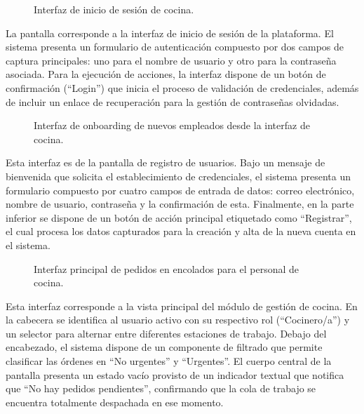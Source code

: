 \begin{figure}[H]
    \centering
    
    \caption{Interfaz de inicio de sesión de cocina.}
    \label{fig:ui-coc-01}
\end{figure}

La pantalla corresponde a la interfaz de inicio de sesión de la plataforma. El sistema presenta un formulario de autenticación compuesto por dos campos de captura principales: uno para el nombre de usuario y otro para la contraseña asociada. Para la ejecución de acciones, la interfaz dispone de un botón de confirmación (``Login'') que inicia el proceso de validación de credenciales, además de incluir un enlace de recuperación para la gestión de contraseñas olvidadas.

\begin{figure}[H]
    \centering
    
    \caption{Interfaz de onboarding de nuevos empleados desde la interfaz de cocina.}
    \label{fig:ui-coc-01-a}
\end{figure}

Esta interfaz es de la pantalla de registro de usuarios. Bajo un mensaje de bienvenida que solicita el establecimiento de credenciales, el sistema presenta un formulario compuesto por cuatro campos de entrada de datos: correo electrónico, nombre de usuario, contraseña y la confirmación de esta. Finalmente, en la parte inferior se dispone de un botón de acción principal etiquetado como ``Registrar'', el cual procesa los datos capturados para la creación y alta de la nueva cuenta en el sistema.

\begin{figure}[H]
    \centering
    
    \caption{Interfaz principal de pedidos en encolados para el personal de cocina.}
    \label{fig:ui-coc-02}
\end{figure}

Esta interfaz corresponde a la vista principal del módulo de gestión de cocina. En la cabecera se identifica al usuario activo con su respectivo rol (``Cocinero/a'') y un selector para alternar entre diferentes estaciones de trabajo. Debajo del encabezado, el sistema dispone de un componente de filtrado que permite clasificar las órdenes en ``No urgentes'' y ``Urgentes''. El cuerpo central de la pantalla presenta un estado vacío provisto de un indicador textual que notifica que ``No hay pedidos pendientes'', confirmando que la cola de trabajo se encuentra totalmente despachada en ese momento.

